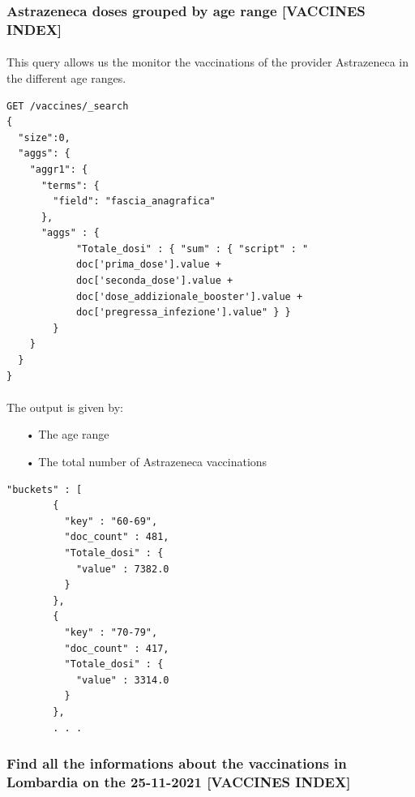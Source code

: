 \documentclass[a4paper,12pt]{article}
\begin{document}
\subsubsection{Astrazeneca doses grouped by age range [VACCINES INDEX]}
\paragraph{} This query allows us the monitor the vaccinations of the provider Astrazeneca in the different age ranges.
\begin{tcolorbox}[colback=green!5!white,colframe=green!75!black,title=QUERY]
\begin{verbatim}
GET /vaccines/_search
{
  "size":0,
  "aggs": {
    "aggr1": {
      "terms": {
        "field": "fascia_anagrafica"
      },
      "aggs" : {
            "Totale_dosi" : { "sum" : { "script" : "
            doc['prima_dose'].value + 
            doc['seconda_dose'].value + 
            doc['dose_addizionale_booster'].value + 
            doc['pregressa_infezione'].value" } }
        }
    }
  }
}
\end{verbatim}
\end{tcolorbox}
\newpage

\paragraph{} The output is given by: 
\begin{itemize}
\item[•] The age range
\item[•] The total number of Astrazeneca vaccinations
\end{itemize}
\begin{tcolorbox}[colback=red!5!white,colframe=red!75!black,title=OUTPUT]
\begin{verbatim}
"buckets" : [
        {
          "key" : "60-69",
          "doc_count" : 481,
          "Totale_dosi" : {
            "value" : 7382.0
          }
        },
        {
          "key" : "70-79",
          "doc_count" : 417,
          "Totale_dosi" : {
            "value" : 3314.0
          }
        },
        . . .
\end{verbatim}
\end{tcolorbox}
\newpage

\subsubsection{Find all the informations about the vaccinations in Lombardia on the 25-11-2021 [VACCINES INDEX]}
\end{document}
